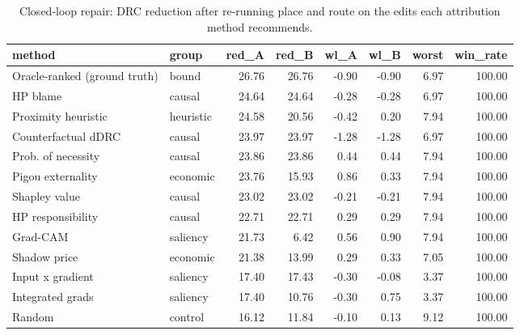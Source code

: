 \begin{table}
\caption{Closed-loop repair: DRC reduction after re-running place and route on the edits each attribution method recommends.}
\label{tab:repair_summary}
\begin{tabular}{llrrrrrr}
\toprule
method & group & red_A & red_B & wl_A & wl_B & worst & win_rate \\
\midrule
Oracle-ranked (ground truth) & bound & 26.76 & 26.76 & -0.90 & -0.90 & 6.97 & 100.00 \\
HP blame & causal & 24.64 & 24.64 & -0.28 & -0.28 & 6.97 & 100.00 \\
Proximity heuristic & heuristic & 24.58 & 20.56 & -0.42 & 0.20 & 7.94 & 100.00 \\
Counterfactual dDRC & causal & 23.97 & 23.97 & -1.28 & -1.28 & 6.97 & 100.00 \\
Prob. of necessity & causal & 23.86 & 23.86 & 0.44 & 0.44 & 7.94 & 100.00 \\
Pigou externality & economic & 23.76 & 15.93 & 0.86 & 0.33 & 7.94 & 100.00 \\
Shapley value & causal & 23.02 & 23.02 & -0.21 & -0.21 & 7.94 & 100.00 \\
HP responsibility & causal & 22.71 & 22.71 & 0.29 & 0.29 & 7.94 & 100.00 \\
Grad-CAM & saliency & 21.73 & 6.42 & 0.56 & 0.90 & 7.94 & 100.00 \\
Shadow price & economic & 21.38 & 13.99 & 0.29 & 0.33 & 7.05 & 100.00 \\
Input x gradient & saliency & 17.40 & 17.43 & -0.30 & -0.08 & 3.37 & 100.00 \\
Integrated grads & saliency & 17.40 & 10.76 & -0.30 & 0.75 & 3.37 & 100.00 \\
Random & control & 16.12 & 11.84 & -0.10 & 0.13 & 9.12 & 100.00 \\
\bottomrule
\end{tabular}
\end{table}
